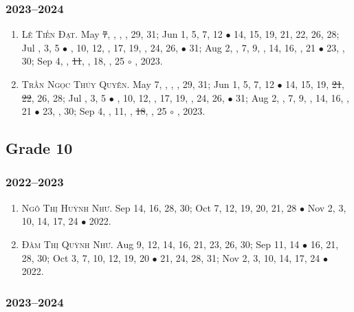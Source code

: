 \documentclass{article}
\begin{document}
\subsubsection{2023--2024}

\begin{enumerate}
	\item \textsc{Lê Tiến Đạt.} May \st{7}, , , , 29, 31; Jun 1, 5, 7, 12 $\bullet$ 14, 15, 19, 21, 22, 26, 28; Jul , 3, 5 $\bullet$ , 10, 12, , 17, 19, , 24, 26,  $\bullet$ 31; Aug 2, , 7, 9, , 14, 16, , 21 $\bullet$ 23, , 30; Sep 4, , \st{11}, , 18, , 25 $\circ$ , 2023.
	\item \textsc{Trần Ngọc Thúy Quyên.} May 7, , , , 29, 31; Jun 1, 5, 7, 12 $\bullet$ 14, 15, 19, \st{21}, \st{22}, 26, 28; Jul , 3, 5 $\bullet$ , 10, 12, , 17, 19, , 24, 26,  $\bullet$ 31; Aug 2, , 7, 9, , 14, 16, , 21 $\bullet$ 23, , 30; Sep 4, , 11, , \st{18}, , 25 $\circ$ , 2023.
\end{enumerate}


\subsection{Grade 10}

\subsubsection{2022--2023}

\begin{enumerate}
	\item \textsc{Ngô Thị Huỳnh Như.} {\sf[In]} Sep 14, 16, 28, 30; Oct 7, 12, 19, 20, 21, 28 $\bullet$ Nov 2, 3, 10, 14, 17, 24 $\bullet$ 2022. {\sf[Out]}
	\item \textsc{Đàm Thị Quỳnh Như.} {\sf[In]} Aug 9, 12, 14, 16, 21, 23, 26, 30; Sep 11, 14 $\bullet$ 16, 21, 28, 30; Oct 3, 7, 10, 12, 19, 20 $\bullet$ 21, 24, 28, 31; Nov 2, 3, 10, 14, 17, 24 $\bullet$ 2022. {\sf[Out]}
\end{enumerate}

\subsubsection{2023--2024}
\end{document}
